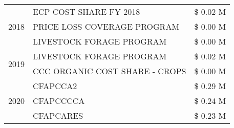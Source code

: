 \begin{tabular}{llr}
\cline{1-3}
\multirow[t]{3}{*}{2018} & ECP COST SHARE FY 2018 & \$ 0.02 M \\
 & PRICE LOSS COVERAGE PROGRAM & \$ 0.00 M \\
 & LIVESTOCK FORAGE PROGRAM & \$ 0.00 M \\
\cline{1-3}
\multirow[t]{2}{*}{2019} & LIVESTOCK FORAGE PROGRAM & \$ 0.02 M \\
 & CCC ORGANIC COST SHARE - CROPS & \$ 0.00 M \\
\cline{1-3}
\multirow[t]{3}{*}{2020} & CFAPCCA2 & \$ 0.29 M \\
 & CFAPCCCCA & \$ 0.24 M \\
 & CFAPCARES & \$ 0.23 M \\
\cline{1-3}
\bottomrule
\end{tabular}
